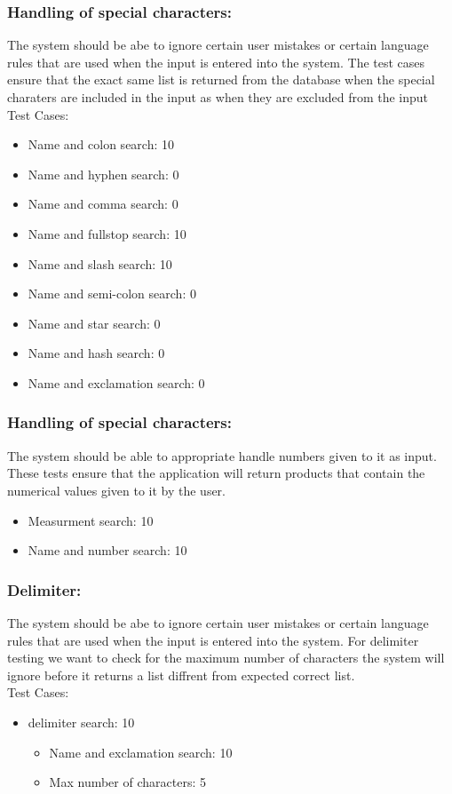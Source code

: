 \documentclass[11pt]{article}
\begin{document}
	\subsubsection{Handling of special characters: }
	The system should be abe to ignore certain user mistakes or certain language rules that are used when the input is entered into the system. The test cases ensure that the exact same list is returned from the database when the special charaters are included in the input as when they are excluded from the input\\
	Test Cases:
	 \begin{itemize}
	 \item Name and colon search: 10
         \item Name and hyphen search: 0
         \item Name and comma search: 0
         \item Name and fullstop search: 10 
         \item Name and slash search: 10
         \item Name and semi-colon search: 0
         \item Name and star search: 0
         \item Name and hash search: 0
         \item Name and exclamation search: 0
        \end{itemize}

	\subsubsection{Handling of special characters: }
	The system should be able to appropriate handle numbers given to it as input. These tests ensure that the application will return products that contain the numerical values given to it by the user.
	\begin{itemize}
	\item Measurment search: 10
	\item Name and number search: 10
        \end{itemize}

	\subsubsection{Delimiter: }
	The system should be abe to ignore certain user mistakes or certain language rules that are used when the input is entered into the system. For delimiter testing we want to check for the maximum number of characters the system will ignore before it returns a list diffrent from expected correct list.\\
	Test Cases:
	 \begin{itemize}
	 \item delimiter search: 10
		 \begin{itemize}
         	 \item Name and exclamation search: 10
        	 \item Max number of characters: 5
        	 \end{itemize}
        \end{itemize}
	
\end{document}
